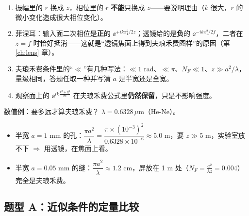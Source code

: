 \begin{warn}[推导题易错]
\begin{enumerate}
\item 振幅里的 $r$ 换成 $z$，相位里的 $r$ \textbf{不能}只换成 $z$——要说明理由（$k$ 很大，$r$ 的微小变化造成很大相位变化）。
\item 菲涅耳：输入面二次相位是\textbf{正}的 $\ee^{+ik x_1^2/2z}$；透镜给的是\textbf{负}的 $\ee^{-ikx_1^2/2f}$，二者在 $z=f$ 时恰好抵消——这就是“透镜焦面上得到夫琅禾费图样”的原因（第 \ref{ch:lens} 章）。
\item 夫琅禾费条件里的“$\ll$”有几种写法：$\ll1$ rad、$\ll\pi$、$N_F\ll1$、$z\gg a^2/\lambda$，量级相同，答题任取一种并写清 $a$ 是半宽还是全宽。
\item 观察面上的 $\ee^{ik\frac{x^2+y^2}{2z}}$ 在夫琅禾费公式里\textbf{仍然保留}，只是不影响强度。
\end{enumerate}
\end{warn}

\begin{exam}{数值例：要多远才算夫琅禾费？}
$\lambda=0.6328\,\mu$m（He-Ne）。
\begin{itemize}
\item 半宽 $a=1$ mm 的孔：$\dfrac{\pi a^2}{\lambda}=\dfrac{\pi\times(10^{-3})^2}{0.6328\times10^{-6}}\approx5.0$ m，要 $z\gg5$ m，实验室放不下 $\Rightarrow$ 用透镜，在焦面上看。
\item 半宽 $a=0.05$ mm 的缝：$\dfrac{\pi a^2}{\lambda}\approx1.2$ cm，屏放在 1 m 处（$N_F=\frac{a^2}{\lambda z}=0.004$）完全是夫琅禾费。
\end{itemize}
\end{exam}

\subsection{题型 A：近似条件的定量比较}\label{ex:approxcmp}

